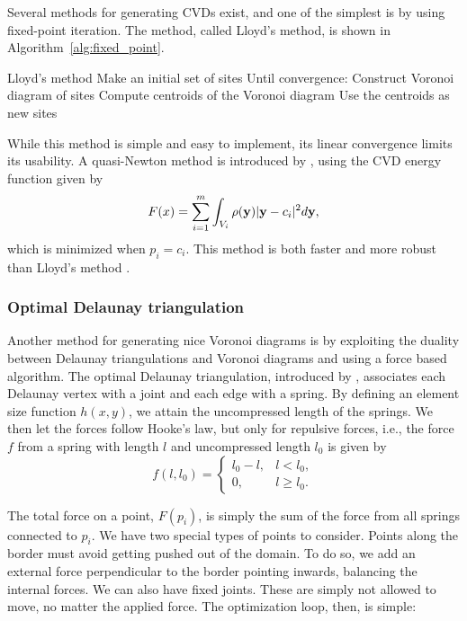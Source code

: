 Several methods for generating CVDs exist, and one of the simplest is by using fixed-point iteration. The method, called Lloyd's method, is shown in Algorithm~\ref{alg:fixed_point}.

\begin{pseudocode}[label=alg:fixed_point]{Lloyd's method}
    Make an initial set of sites
    Until convergence:
        Construct Voronoi diagram of sites
        Compute centroids of the Voronoi diagram
        Use the centroids as new sites
\end{pseudocode}

While this method is simple and easy to implement, its linear convergence limits its usability. A quasi-Newton method is introduced by \textcite{CVDmethods}, using the CVD energy function given by
\begin{equation}
    F(x) = \sum_{i=1}^m \int_{V_i} \rho(\mathbf{y}) \lvert\mathbf{y} - c_i\rvert^2 d\mathbf{y},
\end{equation}
which is minimized when $p_i = c_i$. This method is both faster and more robust than Lloyd's method \cite{CVDmethods}.

\subsubsection{Optimal Delaunay triangulation}
\label{sec:optimal-delaunay}
Another method for generating nice Voronoi diagrams is by exploiting the duality between Delaunay triangulations and Voronoi diagrams and using a force based algorithm. The optimal Delaunay triangulation, introduced by \textcite{Distmesh}, associates each Delaunay vertex with a joint and each edge with a spring. By defining an element size function $h(x, y)$, we attain the uncompressed length of the springs. We then let the forces follow Hooke's law, but only for repulsive forces, i.e., the force $f$ from a spring with length $l$ and uncompressed length $l_0$ is given by
\begin{equation}
    \label{eq:delaunay_force}
    f(l, l_0) = \begin{cases}
        l_0 - l, & l < l_0, \\
        0, & l \ge l_0.
    \end{cases}
\end{equation}

The total force on a point, $F(p_i)$, is simply the sum of the force from all springs connected to $p_i$. We have two special types of points to consider. Points along the border must avoid getting pushed out of the domain. To do so, we add an external force perpendicular to the border pointing inwards, balancing the internal forces. We can also have fixed joints. These are simply not allowed to move, no matter the applied force. The optimization loop, then, is simple:

